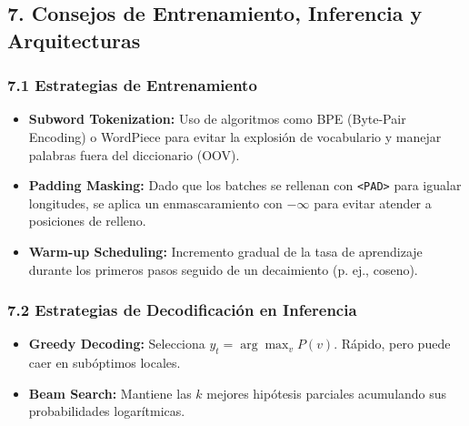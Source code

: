 \documentclass[11pt,oneside]{article}
\begin{document}
\subsection{7. Consejos de Entrenamiento, Inferencia y Arquitecturas}

\subsubsection{7.1 Estrategias de Entrenamiento}

\begin{itemize}

\item \textbf{Subword Tokenization:} Uso de algoritmos como BPE (Byte-Pair Encoding) o WordPiece para evitar la explosión de vocabulario y manejar palabras fuera del diccionario (OOV).

\end{itemize}

\begin{itemize}

\item \textbf{Padding Masking:} Dado que los batches se rellenan con \texttt{<PAD>} para igualar longitudes, se aplica un enmascaramiento con \(-\infty\) para evitar atender a posiciones de relleno.

\end{itemize}

\begin{itemize}

\item \textbf{Warm-up Scheduling:} Incremento gradual de la tasa de aprendizaje durante los primeros pasos seguido de un decaimiento (p. ej., coseno).

\end{itemize}

\subsubsection{7.2 Estrategias de Decodificación en Inferencia}

\begin{itemize}

\item \textbf{Greedy Decoding:} Selecciona \(y_t = \arg\max_v P(v)\). Rápido, pero puede caer en subóptimos locales.

\end{itemize}

\begin{itemize}

\item \textbf{Beam Search:} Mantiene las \(k\) mejores hipótesis parciales acumulando sus probabilidades logarítmicas.

\end{itemize}
\end{document}
